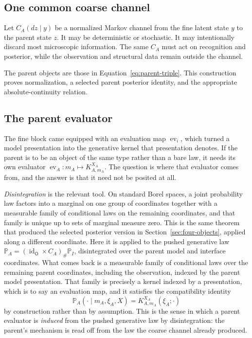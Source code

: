 \documentclass[11pt,letterpaper]{article}
\newcommand{\Prob}{\mathbb P}
\newcommand{\id}{\operatorname{id}}
\newcommand{\ev}{\operatorname{ev}}
\begin{document}
\subsection{One common coarse channel}

Let \(C_A(dz\mid y)\) be a normalized Markov channel from the fine latent state \(y\) to the parent state \(z\). It may be deterministic or stochastic. It may intentionally discard most microscopic information. The same \(C_A\) must act on recognition and posterior, while the observation and structural data remain outside the channel.

The parent objects are those in Equation~\eqref{eq:parent-triple}. This construction proves normalization, a selected parent posterior identity, and the appropriate absolute-continuity relation.

\subsection{The parent evaluator}
\label{sec:parent-evaluator}

The fine block came equipped with an evaluation map \(\ev_i\), which turned a model presentation into the generative kernel that presentation denotes. If the parent is to be an object of the same type rather than a bare law, it needs its own evaluator \(\ev_A:m_A\mapsto K_{A,m_A}^{X_A}\). The question is where that evaluator comes from, and the answer is that it need not be posited at all.

\emph{Disintegration} is the relevant tool. On standard Borel spaces, a joint probability law factors into a marginal on one group of coordinates together with a measurable family of conditional laws on the remaining coordinates, and that family is unique up to sets of marginal measure zero. This is the same theorem that produced the selected posterior version in Section~\ref{sec:four-objects}, applied along a different coordinate. Here it is applied to the pushed generative law \(\Prob_A=(\id_{\mathsf O}\times C_A)_{\#}\Prob_I\), disintegrated over the parent model and interface coordinates. What comes back is a measurable family of conditional laws over the remaining parent coordinates, including the observation, indexed by the parent model presentation. That family is precisely a kernel indexed by a presentation, which is to say an evaluation map, and it satisfies the compatibility identity
\[
  \Prob_A(\cdot\mid m_A,\xi_A,X)=K_{A,m_A}^{X_A}(\xi_A;\cdot)
\]
by construction rather than by assumption. This is the sense in which a parent evaluator is \emph{induced} from the pushed generative law by disintegration: the parent's mechanism is read off from the law the coarse channel already produced.
\end{document}
